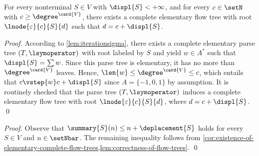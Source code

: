 \begin{corollary}
  \label{cor:existence-of-elementary-complete-flow-trees}
  For every nonterminal $S \in V$ with $\displ{S} < +\infty$,
  and for every $c \in \setN$ with $c\geq \degree^{\card{V}}$,
  there exists a complete elementary flow tree with root
  $\lnode{\varepsilon}{c}{S}{d}$ such that
  $d = c + \displ{S}$.
\end{corollary}
\begin{proof}
  According to \cref{lem:iterationsigma},
  there exists a complete elementary parse tree $(T, \lsymoperator)$
  with root labeled by $S$ and
  yield $w \in A^*$ such that $\displ{S} = \sum w$.
  Since this parse tree is elementary,
  it has no more than $\degree^{\card{V}}$ leaves.
Hence, $\len{w} \leq \degree^{\card{V}}\leq c$,
  which entails that
  $c \vstep{w} c + \displ{S}$ since $A=\{-1,0,1\}$ by assumption.
  It is routinely checked that
  the parse tree $(T, \lsymoperator)$ induces
  a complete elementary flow tree with root $\lnode{\varepsilon}{c}{S}{d}$,
  where $d = c + \displ{S}$.
  \qed
\end{proof}



\existselementaryparsetree*
\begin{proof}
  Observe that $\summary{S}(n)\leq n+\deplacement{S}$ holds
  for every $S\in V$ and $n \in \setNbar$.
  The remaining inequality follows from
  \cref{cor:existence-of-elementary-complete-flow-trees,lem:correctness-of-flow-trees}.
\qed
\end{proof}








